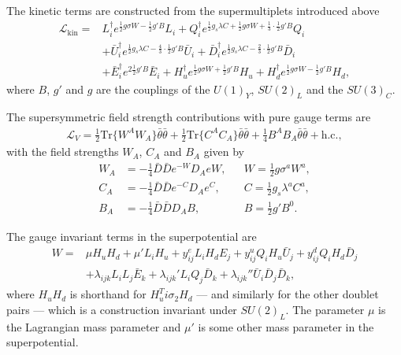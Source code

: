 \documentclass[twoside,english]{uiofysmaster}
\begin{document}
{The kinetic terms are constructed from the supermultiplets introduced above
\begin{align}
\mathcal{L}_{\text{kin}} =& L_i^{\dagger} e^{\frac{1}{2}g \sigma W - \frac{1}{2}g'B} L_i + Q_i^{\dagger} e^{\frac{1}{2}g_s \lambda C+ \frac{1}{2} g \sigma W + \frac{1}{3} \cdot \frac{1}{2} g' B} Q_i \nonumber \\
&+ \bar{U}_i^{\dagger} e^{\frac{1}{2}g_s \lambda C - \frac{4}{3} \cdot \frac{1}{2} g' B} \bar{U}_i + \bar{D}_i^{\dagger} e^{\frac{1}{2}g_s \lambda C - \frac{2}{3} \cdot \frac{1}{2} g' B} \bar{D}_i \nonumber \\
&+ \bar{E}_i^{\dagger} e^{2 \frac{1}{2}g'B} \bar{E}_i + H_u^{\dagger} e^{\frac{1}{2} g \sigma W + \frac{1}{2} g'B} H_u + H_d^{\dagger} e^{\frac{1}{2} g \sigma W - \frac{1}{2} g'B} H_d,
\end{align}
where $B$, $g'$ and $g$ are the couplings of the $U(1)_Y$, $SU(2)_L$ and the $SU(3)_C$. 

The supersymmetric field strength contributions with pure gauge terms are
\begin{align}
\mathcal{L}_V = \frac{1}{2} \text{Tr} \big \{ W^AW_A \big \} \bar{\theta} \bar{\theta} + \frac{1}{2} \text{Tr} \big \{ C^AC_A \big \} \bar{\theta} \bar{\theta} + \frac{1}{4} B^AB_A \bar{\theta} \bar{\theta} + \text{h.c.},
\end{align}
with the field strengths $W_A$, $C_A$ and $B_A$ given by
\begin{align}
W_A &= - \frac{1}{4} \bar{D} \bar{D} e^{-W}D_A eW, &&W = \frac{1}{2} g \sigma^a W^a,\\
C_A &= - \frac{1}{4} \bar{D} \bar{D} e^{-C} D_A e^C, &&C = \frac{1}{2} g_s\lambda^a C^a,\\
B_A &= - \frac{1}{4} \bar{D} \bar{D} D_A B, &&B = \frac{1}{2}g'B^0.
\end{align}

The gauge invariant terms in the superpotential are
\begin{align}
W =& \mu H_u H_d + \mu' L_i H_u + y_{ij}^e L_i H_d E_j + y_{ij}^u Q_i H_u \bar{U}_j + y_{ij}^d Q_i H_d \bar{D}_j \nonumber \\
&+ \lambda_{ijk} L_i L_j\bar{E}_k + \lambda_{ijk}' L_i Q_j \bar{D}_k + \lambda_{ijk}'' \bar{U}_i \bar{D}_j \bar{D}_k,
\end{align}
where $H_uH_d$ is shorthand for $H_u^T i \sigma_2 H_d$ --- and similarly for the other doublet pairs --- which is a construction invariant under $SU(2)_L$. The parameter $\mu$ is the Lagrangian mass parameter and $\mu'$ is some other mass parameter in the superpotential.
 

}
\end{document}
